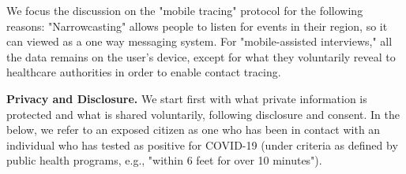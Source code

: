 \documentclass{article}
\begin{document}
We focus the discussion on the "mobile tracing" protocol for the following reasons:  "Narrowcasting" allows people to listen for events in their region, so it can viewed as a one way messaging system. For "mobile-assisted interviews," all the data remains on the user's device, except for what they voluntarily reveal to healthcare authorities in order to enable contact tracing.



\textbf{Privacy and Disclosure.} We start first with what private information is protected and what is shared voluntarily, following disclosure and consent. In the below, we refer to an exposed citizen as one who has been in contact with an individual who has tested as positive for COVID-19 (under criteria as defined by public health programs, e.g., "within 6 feet for over 10 minutes").


\end{document}
